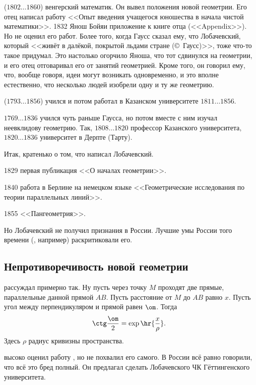 \documentclass[a4paper,oneside,fleqn,10pt]{article}
\newcommand{\pe}[2]{${#1}\ldots{#2}$}
\begin{document}
 (\pe{1802}{1860})
венгерский математик.  Он вывел положения новой геометрии. Его отец
 написал работу
<<Опыт введения учащегося юношества в начала чистой математики>>.
1832 Янош Бойяи приложение к книге отца (<<Appendix>>). Но
 не оценил его работ.  Более того, когда Гаусс сказал ему,
что Лобачевский, который <<живёт в далёкой, покрытой льдами стране
(\copyright~Гаусс)>>, тоже что-то такое придумал.  Это настолько
огорчило Яноша, что тот сдвинулся на геометрии, и его отец отговаривал
его от занятий геометрией. Кроме того, он говорил ему, что, вообще
говоря, идеи могут возникать одновременно, и это вполне естественно,
что несколько людей изобрели одну и ту же геометрию.

(\pe{1793}{1856}) учился и потом работал в Казанском университете
\pe{1811}{1856}.

 \pe{1769}{1836} учился чуть раньше Гаусса, но потом
вместе с ним изучал неевклидову геометрию. Так, \pe{1808}{1820}
профессор Казанского университета, \pe{1820}{1836} университет в
Дерпте (Тарту).

Итак, кратенько о том, что написал Лобачевский.

1829 первая публикация <<О началах геометрии>>.

1840 работа в Берлине на немецком языке <<Геометрические исследования
по теории параллельных линий>>.

1855 <<Пангеометрия>>.

Но Лобачевский не получил признания в России.  Лучшие умы России того
времени (, например) раскритиковали его.

\subsection{Непротиворечивость новой геометрии}

 рассуждал примерно так.  Ну пусть через точку $M$
проходят две прямые, параллельные данной прямой $AB$. Пусть расстояние
от $M$ до $AB$ равно $x$.  Пусть угол между перпендикуляром и прямой
равен $\om$.  Тогда
$$\ctg \frac{\om}{2} = \exp\hr{\frac{x}{\rho}}.$$ Здесь $\rho$ радиус
кривизны пространства.

 высоко оценил работу ,
но не похвалил его самого.  В России всё равно говорили, что всё это
бред полный.  Он предлагал сделать Лобачевского ЧК Гёттингенского
университета.
\end{document}
